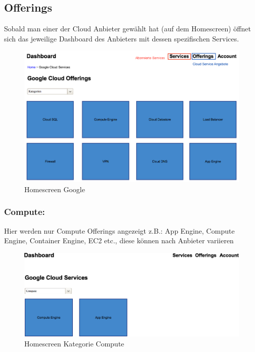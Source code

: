 \subsection{Offerings}
Sobald man einer der Cloud Anbieter gewählt hat (auf dem Homescreen) öffnet 
sich das jeweilige Dashboard des Anbieters mit dessen spezifischen Services.
\begin{figure}[!htbp]
  \includegraphics[width=\textwidth]{./03_Analyse/03_Dashboard/images/homescreen_google}
  \caption{Homescreen Google}
\end{figure}

\newpage

   \subsubsection{Compute:}
Hier werden nur Compute Offerings angezeigt z.B.: App Engine, Compute Engine, 
Container Engine, EC2 etc., diese können nach Anbieter variieren

\begin{figure}[!htbp]

   \includegraphics[width=\textwidth]{./03_Analyse/03_Dashboard/images/homescreen_google_compute}
   \caption{Homescreen Kategorie Compute}
\end{figure}
 

